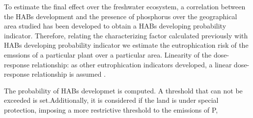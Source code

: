 \documentclass[10pt,a4paper]{article}
\begin{document}
To estimate the final effect over the freshwater ecosystem, a correlation between the HABs development and the presence of phosphorus over the geographical area studied has been developed to obtain a HABs developing probability indicator. Therefore, relating the characterizing factor calculated previously with HABs developing probability indicator we estimate the eutrophication risk of the emssions of a particular plant over a particular area. Linearity of the dose-response relationship: as other eutrophication indicators developed, a linear dose-response relationship is assumed \cite{IChemE_sust_metrics, ReCiPe_2016}.

The probability of HABs developmet is computed. A threshold that can not be exceeded is set.Additionally, it is considered if the land is under special protection, imposing a more restrictive threshold to the emissions of P,

%

%
\end{document}
